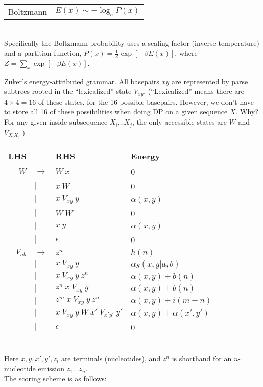 \documentclass{beamer}
\begin{document}
\begin{frame}{}
\begin{tabular}{l|r}
Boltzmann & $E(x) \sim -\log_e P(x)$
\end{tabular}
\\
Specifically the Boltzmann probability uses a scaling factor (inverse temperature) and a partition function,
$P(x) = \frac{1}{Z} \exp[-\beta E(x)]$,
where $Z = \sum_x \exp[-\beta E(x)]$.
 \item Zuker's energy-attributed grammar.
All basepairs $xy$ are represented by parse subtrees rooted in the ``lexicalized'' state $V_{xy}$.
(``Lexicalized'' means there are $4 \times 4 = 16$ of these states, for the 16 possible basepairs.
However, we don't have to store all 16 of these possibilities when doing DP on a given sequence $X$.
Why? For any given inside subsequence $X_i \ldots X_j$, the only accessible states are $W$ and $V_{X_i X_j}$.)
\\
\begin{tabular}{rll|l}
LHS & & RHS & Energy \\
\hline
$W$ & $\to$ & $W\ x$         & 0 \\
    &   $|$ & $x\ W$         & 0 \\
    &   $|$ & $x\ V_{xy}\ y$ & $\alpha(x,y)$ \\
    &   $|$ & $W\ W$         & 0 \\
    &   $|$ & $x\ y$         & $\alpha(x,y)$ \\
    &   $|$ & $\epsilon$     & 0 \\
$V_{ab}$ & $\to$ & $z^n$                               & $h(n)$ \\
         &   $|$ & $x\ V_{xy}\ y$                      & $\alpha_S(x,y|a,b)$ \\
         &   $|$ & $x\ V_{xy}\ y\ z^n$                 & $\alpha(x,y) + b(n)$ \\
         &   $|$ & $z^n\ x\ V_{xy}\ y$                 & $\alpha(x,y) + b(n)$ \\
         &   $|$ & $z^m\ x\ V_{xy}\ y\ z^n$            & $\alpha(x,y) + i(m+n)$ \\
         &   $|$ & $x\ V_{xy}\ y\ W\ x'\ V_{x'y'}\ y'$ & $\alpha(x,y) + \alpha(x',y')$ \\
         &   $|$ & $\epsilon$                          & 0
\end{tabular}
\\
Here $x,y,x',y',z_i$ are terminals (nucleotides), and $z^n$ is shorthand for an $n$-nucleotide emission $z_1 \ldots z_n$.
\\
The scoring scheme is as follows:

\end{frame}
\end{document}

